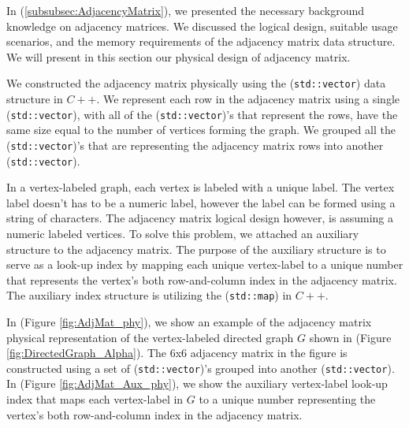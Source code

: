 {In (\ref{subsubsec:AdjacencyMatrix}), we presented the necessary background knowledge on adjacency matrices. We discussed the logical design, suitable usage scenarios, and the memory requirements of the adjacency matrix data structure. We will present in this section our physical design of adjacency matrix.


We constructed the adjacency matrix physically using the (\texttt{std::vector}) data structure in $C++$. We represent each row in the adjacency matrix using a single (\texttt{std::vector}), with all of the (\texttt{std::vector})'s that represent the rows, have the same size equal to the number of vertices forming the graph. We grouped all the (\texttt{std::vector})'s that are representing the adjacency matrix rows into another (\texttt{std::vector}).


In a vertex-labeled graph, each vertex is labeled with a unique label. The vertex label doesn't has to be a numeric label, however the label can be formed using a string of characters. The adjacency matrix logical design however, is assuming a numeric labeled vertices. To solve this problem, we attached an auxiliary structure to the adjacency matrix. The purpose of the auxiliary structure is to serve as a look-up index by mapping each unique vertex-label to a unique number that represents the vertex's both row-and-column index in the adjacency matrix. The auxiliary index structure is utilizing the (\texttt{std::map}) in $C++$.


In (Figure \ref{fig:AdjMat_phy}), we show an example of the adjacency matrix physical representation of the vertex-labeled directed graph $G$ shown in (Figure \ref{fig:DirectedGraph_Alpha}). The 6x6 adjacency matrix in the figure is constructed using a set of (\texttt{std::vector})'s grouped into another (\texttt{std::vector}). In (Figure \ref{fig:AdjMat_Aux_phy}), we show the auxiliary vertex-label look-up index that maps each vertex-label in $G$ to a unique number representing the vertex's both row-and-column index in the adjacency matrix.



}
